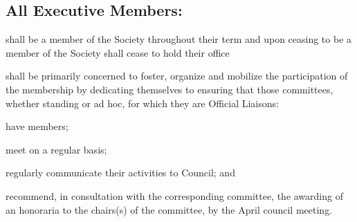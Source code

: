 \subsection [The Executive (General)]{All Executive Members:}
\begin{longenum}[ label*=\thesubsection.\arabic*., align=left]
	\item shall be a member of the Society throughout their term and upon ceasing to be a member of the Society shall cease to hold their office
    \item shall be primarily concerned to foster, organize and mobilize the participation of the membership by dedicating themselves to ensuring that those committees, whether standing  or ad hoc, for which they are Official Liaisons:
   \begin{longenum}[ label*=\arabic*., align=left]
		\item have members;
   		\item meet on a regular basis;
        \item regularly communicate their activities to Council; and
   		\item recommend, in consultation with the corresponding committee, the awarding of an honoraria to the chairs(s) of the committee, by the April council meeting.  
   		
	\end{longenum}
	

\end{longenum}
